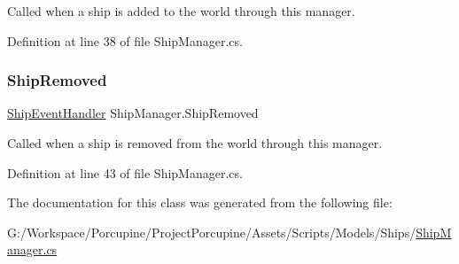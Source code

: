 Called when a ship is added to the world through this manager. 



Definition at line 38 of file Ship\+Manager.\+cs.

\mbox{\label{class_ship_manager_a896ffeb71731c612b9da2dc9ffdcdae7}} 
\subsubsection{\texorpdfstring{Ship\+Removed}{ShipRemoved}}
{\footnotesize\ttfamily \hyperlink{class_ship_manager_a9dbbc387497ab2f4fc7c90cde65dfd4d}{Ship\+Event\+Handler} Ship\+Manager.\+Ship\+Removed}



Called when a ship is removed from the world through this manager. 



Definition at line 43 of file Ship\+Manager.\+cs.



The documentation for this class was generated from the following file\+:\begin{DoxyCompactItemize}
\item 
G\+:/\+Workspace/\+Porcupine/\+Project\+Porcupine/\+Assets/\+Scripts/\+Models/\+Ships/\hyperlink{_ship_manager_8cs}{Ship\+Manager.\+cs}\end{DoxyCompactItemize}
